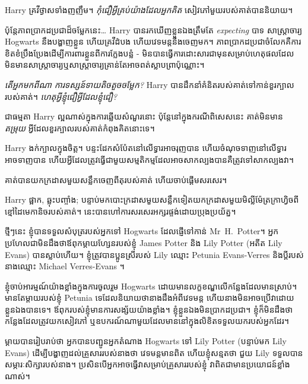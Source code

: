 Harry គ្រវី​ថ្ងាស​ទាំង​ញញឹម។ \emph{កុំជឿអ្វីគ្រប់យ៉ាងដែលអ្នកគិត} សៀវភៅមួយរបស់គាត់បាននិយាយ។

ប៉ុន្តែភាពប្រាកដប្រជាដ៏ចម្លែកនេះ… Harry បានរកឃើញខ្លួនឯងត្រឹមតែ \emph{expecting} បាទ សាស្រ្តាចារ្យ Hogwarts នឹងបង្ហាញខ្លួន ហើយគ្រវីដំបង ហើយវេទមន្តនឹងចេញមក។ ភាពប្រាកដប្រជាចំលែកគឺការខិតខំប្រឹងប្រែងដើម្បីការពារខ្លួនពីការក្លែងបន្លំ - មិនបានធ្វើការដោះសារជាមុនសម្រាប់ហេតុផលដែលមិនមានសាស្រ្តាចារ្យឬសាស្រ្តាចារ្យគ្រាន់តែអាចពត់ស្លាបព្រាប៉ុណ្ណោះ។

\emph{តើអ្នកមកពីណា ការទស្សន៍ទាយតិចតួចចម្លែក?} Harry បានដឹកនាំគំនិតរបស់គាត់ទៅកាន់ខួរក្បាលរបស់គាត់។ \emph{ហេតុអ្វីខ្ញុំជឿអ្វីដែលខ្ញុំជឿ?}

ជាធម្មតា Harry ល្អណាស់ក្នុងការឆ្លើយសំណួរនោះ ប៉ុន្តែនៅក្នុងករណីពិសេសនេះ គាត់មិនមាន \emph{តម្រុយ} អ្វីដែលខួរក្បាលរបស់គាត់កំពុងគិតនោះទេ។

Harry ងក់ក្បាលក្នុងចិត្ត។ បន្ទះដែកសំប៉ែតនៅលើទ្វារអាចរុញបាន ហើយចំណុចទាញនៅលើទ្វារអាចទាញបាន ហើយអ្វីដែលត្រូវធ្វើជាមួយសម្មតិកម្មដែលអាចសាកល្បងបានគឺត្រូវទៅសាកល្បងវា។

គាត់បានយកក្រដាសមួយសន្លឹកចេញពីតុរបស់គាត់ ហើយចាប់ផ្តើមសរសេរ។

\begin{writtenNote}
\end{writtenNote}

Harry ផ្អាក, ឆ្លុះបញ្ចាំង; បន្ទាប់​មក​បោះ​ក្រដាស​មួយ​សន្លឹក​ទៀត​យក​ក្រដាស​មួយ​មិល្លីម៉ែត្រ​ក្រាហ្វិច​ពី​ខ្មៅ​ដៃ​មេកានិច​របស់​គាត់។ នេះបានហៅការសរសេរអក្សរផ្ចង់ដោយប្រុងប្រយ័ត្ន។

\begin{writtenNote}


ថ្មីៗនេះ ខ្ញុំបានទទួលសំបុត្ររបស់អ្នកទៅ Hogwarts ដែលផ្ញើទៅកាន់ Mr~H.~Potter។ អ្នកប្រហែលជាមិនដឹងថាឪពុកម្តាយហ្សែនរបស់ខ្ញុំ James Potter និង Lily Potter (អតីត Lily Evans) បានស្លាប់ហើយ។ ខ្ញុំ​ត្រូវ​បាន​ប្អូនស្រី​របស់ Lily ឈ្មោះ Petunia Evans-Verres និង​ប្តី​របស់​នាង​ឈ្មោះ Michael Verres-Evans ។

ខ្ញុំចាប់អារម្មណ៍យ៉ាងខ្លាំងក្នុងការចូលរួម Hogwarts ដោយមានលក្ខខណ្ឌលើកន្លែងដែលមានស្រាប់។ មានតែម្តាយរបស់ខ្ញុំ Petunia ទេដែលនិយាយថានាងដឹងអំពីវេទមន្ត ហើយនាងមិនអាចប្រើវាដោយខ្លួនឯងបានទេ។ ឪពុករបស់ខ្ញុំមានការសង្ស័យយ៉ាងខ្លាំង។ ខ្ញុំ​ខ្លួន​ឯង​មិន​ប្រាកដ​ប្រជា។ ខ្ញុំក៏មិនដឹងថាកន្លែងដែលត្រូវយកសៀវភៅ ឬឧបករណ៍ណាមួយដែលមាននៅក្នុងលិខិតទទួលយករបស់អ្នកដែរ។

ម្ដាយបានរៀបរាប់ថា អ្នកបានបញ្ជូនអ្នកតំណាង Hogwarts ទៅ Lily Potter (បន្ទាប់មក Lily Evans) ដើម្បីបង្ហាញដល់គ្រួសាររបស់នាងថា វេទមន្តមានពិត ហើយខ្ញុំសន្មតថា ជួយ Lily ទទួលបានសម្ភារៈសិក្សារបស់នាង។ ប្រសិនបើអ្នកអាចធ្វើវាសម្រាប់គ្រួសាររបស់ខ្ញុំ វាពិតជាមានប្រយោជន៍ខ្លាំងណាស់។

\end{writtenNote}

